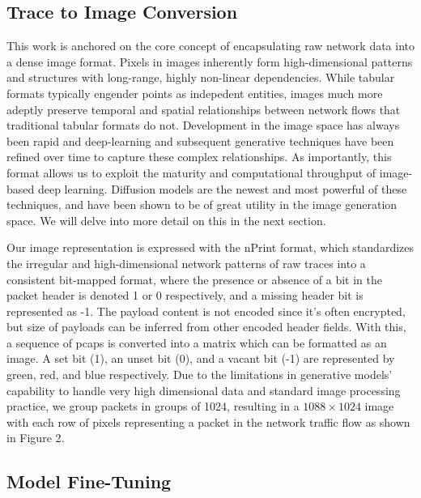 \documentclass[acmsmall, nonacm]{acmart}
\begin{document}
\subsection{Trace to Image Conversion}
This work is anchored on the core concept of encapsulating raw network data
into a dense image format. Pixels in images inherently form high-dimensional 
patterns and structures with long-range, highly non-linear dependencies.
While tabular formats typically engender points as indepedent entities, images 
much more adeptly preserve temporal and spatial relationships between network
flows that traditional tabular formats do not. Development in the image space has always been
rapid and deep-learning and subsequent generative techniques have been refined 
over time to capture these complex relationships. As importantly, this format
allows us to exploit the maturity and computational throughput
of image-based deep learning. Diffusion models are
the newest and most powerful of these techniques, and have been shown to be of
great utility in the image generation space. We will delve into more detail on
this in the next section.

Our image representation is expressed with the nPrint \cite{nPrint} format, which
standardizes the irregular and high-dimensional network patterns of raw 
traces into a consistent bit-mapped format, where the presence or absence of a bit
in the packet header is denoted 1 or 0 respectively, and a missing header bit is
represented as -1. The payload content is not encoded since it's often encrypted, 
but size of payloads can be inferred from other encoded header fields. 
With this, a sequence of pcaps is converted into a matrix which can be formatted
as an image. A set bit (1), an unset bit (0), and a vacant bit (-1) are 
represented by green, red, and blue respectively. 
Due to the limitations in generative models’ capability to handle very high
dimensional data and standard image processing practice, we group packets in 
groups of 1024, resulting in a $1088 \times 1024$ image with each row of pixels
representing a packet in the network traffic flow as shown in Figure 2. 

\subsection{Model Fine-Tuning}
\end{document}
